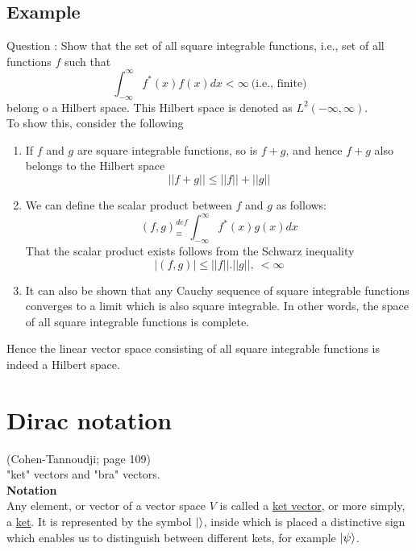 \subsection{Example}
Question : Show that the set of all square integrable functions, i.e., set of all functions $f$ such that
\begin{equation}
\int_{-\infty}^{\infty} f^*(x) f(x) dx < \infty \ \text{(i.e., finite)}
\end{equation}
belong o a Hilbert space. This Hilbert space is denoted as $L^2(-\infty, \infty)$.\\
To show this, consider the following
\begin{enumerate}
	\item 
	If $f$ and $g$ are square integrable functions, so  is $f+g$, and hence $f+g$ also belongs to the Hilbert space
	\begin{equation}
	||f+g|| \leq ||f|| + ||g||
	\end{equation}
	
	\item 
	We can define the scalar product between $f$ and $g$ as follows:
	\begin{equation}
	(f, g) _\equiv^{def} \int_{-\infty}^{\infty} f^*(x) g(x) dx
	\end{equation}
	That the scalar product exists follows from the Schwarz inequality
	\begin{equation}
	|(f, g)| \leq ||f|| . ||g||, \ < \infty
	\end{equation}
	
	
	\item 
	It can also be shown that any Cauchy sequence of square integrable functions converges to a limit which is also square integrable. In other words, the space of all square integrable functions is complete.
\end{enumerate}
Hence the linear vector space consisting of all square integrable functions is indeed a Hilbert space.

\section{Dirac notation}
(Cohen-Tannoudji; page 109) \\
"ket" vectors and "bra" vectors.\\

\textbf{Notation} \\
Any element, or vector of a vector space $V$ is called a \underline{ket vector}, or more simply, a \underline{ket}. It is represented by the symbol $\ket{}$, inside which is placed a distinctive sign which enables us to distinguish between different kets, for example $\ket{\psi}$.
